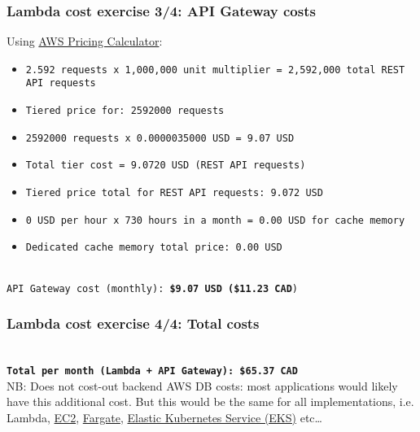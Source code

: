\documentclass[11pt,aspectratio=169]{beamer}
\begin{document}
\begin{nrcanFrame}
  \frametitle{Lambda cost exercise 3/4: API Gateway costs}
  Using
  \href{https://calculator.aws/\#/createCalculator/APIGateway}{AWS
    Pricing Calculator}:
  \ \\ \vspace{1mm}
        {\footnotesize 
            \begin{itemize}
            \item
              \texttt{2.592 requests x 1,000,000 unit multiplier = 2,592,000 total REST API requests}
            \item
              \texttt{Tiered price for: 2592000 requests}
            \item \texttt{2592000 requests x 0.0000035000 USD = 9.07 USD}
            \item \texttt{Total tier cost = 9.0720 USD (REST API requests)}
            \item \texttt{Tiered price total for REST API requests: 9.072 USD}
            \item \texttt{0 USD per hour x 730 hours in a month = 0.00 USD for cache memory}
            \item \texttt{Dedicated cache memory total price: 0.00 USD}
            \end{itemize}
            }
    \ \\
    \texttt{API Gateway cost (monthly): \textbf{\$9.07 USD (\$11.23 CAD})}\\

\end{nrcanFrame}

        \begin{nrcanFrame}
  \frametitle{Lambda cost exercise 4/4: Total costs}
    \ \\ \vspace{1mm}
\texttt{\textbf{Total per month (Lambda + API Gateway): \$65.37 CAD}}
\ \\
\vspace{1cm}
    { \alert{NB: Does not cost-out backend AWS DB costs: most applications
        would likely have this additional cost. But this would be the same for all
        implementations, i.e. Lambda,
        \href{https://aws.amazon.com/ec2/}{EC2},
        \href{https://aws.amazon.com/fargate/?c=ser&sec=srv}{Fargate},
        \href{https://aws.amazon.com/eks/?pg=ln&sec=hiw}{Elastic Kubernetes
          Service (EKS)} etc\ldots
      }
    }
        \end{nrcanFrame}
\end{document}
